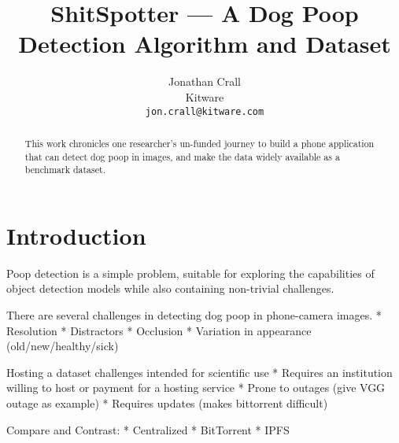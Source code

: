\documentclass[10pt,twocolumn,letterpaper]{article}
\begin{document}
\title{ShitSpotter --- A Dog Poop Detection Algorithm and Dataset}

\author{Jonathan Crall\\
Kitware\\
{\tt\small jon.crall@kitware.com}
}
\maketitle

\begin{abstract}

    This work chronicles one researcher's un-funded journey to build a phone
    application that can detect dog poop in images, and make the data widely
    available as a benchmark dataset.


\end{abstract}

\section{Introduction}
\label{sec:intro}


Poop detection is a simple problem, suitable for exploring the capabilities of
object detection models while also containing non-trivial challenges.

There are several challenges in detecting dog poop in phone-camera images.
* Resolution
* Distractors
* Occlusion
* Variation in appearance (old/new/healthy/sick)


Hosting a dataset challenges intended for scientific use
* Requires an institution willing to host or payment for a hosting service
* Prone to outages (give VGG outage as example)
* Requires updates (makes bittorrent difficult)


Compare and Contrast:
* Centralized
* BitTorrent
* IPFS

\end{document}
